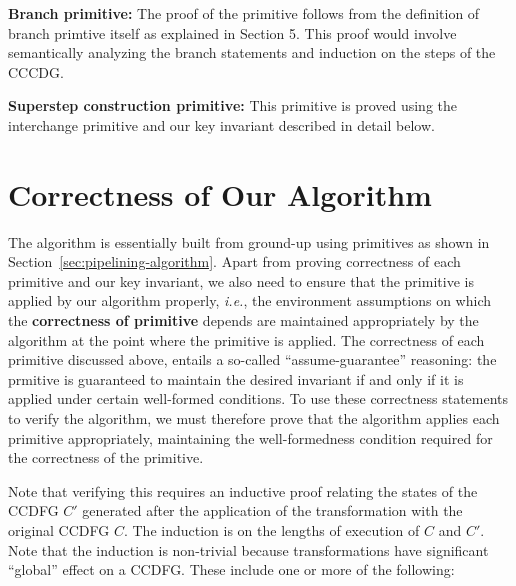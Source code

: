   {\bf Branch primitive:} The proof of the primitive follows from the definition of branch primtive itself as explained in Section 5. This proof would involve semantically analyzing the branch statements and induction on the steps of the CCCDG.

{\bf Superstep construction primitive:} This primitive is proved
using the interchange primitive and our key invariant described in detail below.

\section{Correctness of Our Algorithm}

The algorithm is essentially built from ground-up using primitives
as shown in Section~\ref{sec:pipelining-algorithm}.
Apart from proving correctness of each primitive and our key invariant,
we also need to ensure that the primitive is applied by our
  algorithm properly, {\em i.e.}, the environment
  assumptions on which the {\bf correctness of primitive}
  depends are maintained appropriately by the algorithm at
  the point where the primitive is applied.  The
correctness of each primitive discussed above, entails a
so-called ``assume-guarantee'' reasoning: the prmitive is
guaranteed to maintain the desired invariant if and only if
it is applied under certain well-formed conditions.  To use
these correctness statements to verify the algorithm, we
must therefore prove that the algorithm applies each
primitive appropriately, maintaining the well-formedness
condition required for the correctness of the primitive.

Note that verifying this requires an inductive proof
relating the states of the CCDFG $C'$ generated after the
application of the transformation with the original CCDFG
$C$.  The induction is on the lengths of execution of $C$
and $C'$.  Note that the induction is non-trivial because
transformations have significant ``global'' effect on a
CCDFG.  These include one or more of the following:

